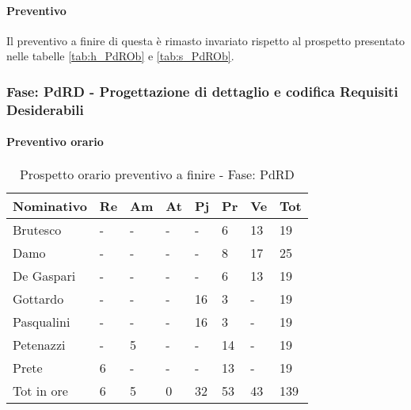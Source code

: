 			\paragraph{Preventivo} Il preventivo a finire di questa  è rimasto invariato rispetto al prospetto presentato nelle tabelle \ref{tab:h_PdROb} e \ref{tab:s_PdROb}.
		\newpage
		\subsubsection {Fase: PdRD - Progettazione di dettaglio e codifica Requisiti Desiderabili}
			\paragraph{Preventivo orario}
				\begin{table}[H] \begin{center} \begin{tabular}{llllllll}
										\toprule
										\textbf{Nominativo}	&	\textbf{Re}	&	\textbf{Am}	&	\textbf{At}	&	\textbf{Pj}	&	\textbf{Pr}	&	\textbf{Ve}	&	\textbf{Tot}	 \\
										\midrule
										Brutesco	&	-	&	-	&	-	&	-	&	6	&	13	&	19	 \\
										Damo		&	-	&	-	&	-	&	-	&	8	&	17	&	25	 \\
										De Gaspari	&	-	&	-	&	-	&	-	&	6	&	13	&	19	 \\
										Gottardo	&	-	&	-	&	-	&	16	&	3	&	-	&	19	 \\
										Pasqualini	&	-	&	-	&	-	&	16	&	3	&	-	&	19	 \\
										Petenazzi	&	-	&	5	&	-	&	-	&	14	&	-	&	19	 \\
										Prete		&	6	&	-	&	-	&	-	&	13	&	-	&	19	 \\
										\midrule
										Tot in ore	&	6	&	5	&	0	&	32	&	53	&	43	&	139	 \\


										\bottomrule
										\end{tabular} \end{center} \caption{Prospetto orario preventivo a finire - Fase:
										PdRD
										} \end{table}

